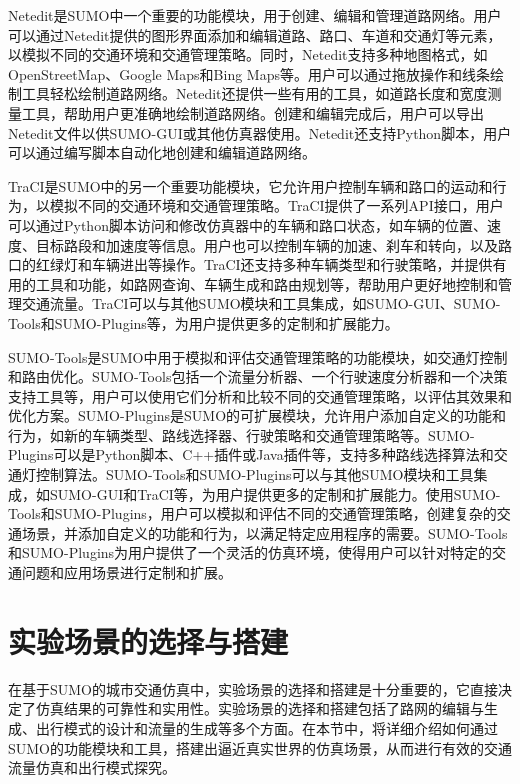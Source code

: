 Netedit是SUMO中一个重要的功能模块，用于创建、编辑和管理道路网络。用户可以通过Netedit提供的图形界面添加和编辑道路、路口、车道和交通灯等元素，以模拟不同的交通环境和交通管理策略。同时，Netedit支持多种地图格式，如OpenStreetMap、Google Maps和Bing Maps等。用户可以通过拖放操作和线条绘制工具轻松绘制道路网络。Netedit还提供一些有用的工具，如道路长度和宽度测量工具，帮助用户更准确地绘制道路网络。创建和编辑完成后，用户可以导出Netedit文件以供SUMO-GUI或其他仿真器使用。Netedit还支持Python脚本，用户可以通过编写脚本自动化地创建和编辑道路网络。

TraCI是SUMO中的另一个重要功能模块，它允许用户控制车辆和路口的运动和行为，以模拟不同的交通环境和交通管理策略。TraCI提供了一系列API接口，用户可以通过Python脚本访问和修改仿真器中的车辆和路口状态，如车辆的位置、速度、目标路段和加速度等信息。用户也可以控制车辆的加速、刹车和转向，以及路口的红绿灯和车辆进出等操作。TraCI还支持多种车辆类型和行驶策略，并提供有用的工具和功能，如路网查询、车辆生成和路由规划等，帮助用户更好地控制和管理交通流量。TraCI可以与其他SUMO模块和工具集成，如SUMO-GUI、SUMO-Tools和SUMO-Plugins等，为用户提供更多的定制和扩展能力。

SUMO-Tools是SUMO中用于模拟和评估交通管理策略的功能模块，如交通灯控制和路由优化。SUMO-Tools包括一个流量分析器、一个行驶速度分析器和一个决策支持工具等，用户可以使用它们分析和比较不同的交通管理策略，以评估其效果和优化方案。SUMO-Plugins是SUMO的可扩展模块，允许用户添加自定义的功能和行为，如新的车辆类型、路线选择器、行驶策略和交通管理策略等。SUMO-Plugins可以是Python脚本、C++插件或Java插件等，支持多种路线选择算法和交通灯控制算法。SUMO-Tools和SUMO-Plugins可以与其他SUMO模块和工具集成，如SUMO-GUI和TraCI等，为用户提供更多的定制和扩展能力。使用SUMO-Tools和SUMO-Plugins，用户可以模拟和评估不同的交通管理策略，创建复杂的交通场景，并添加自定义的功能和行为，以满足特定应用程序的需要。SUMO-Tools和SUMO-Plugins为用户提供了一个灵活的仿真环境，使得用户可以针对特定的交通问题和应用场景进行定制和扩展。



\section{实验场景的选择与搭建}

在基于SUMO的城市交通仿真中，实验场景的选择和搭建是十分重要的，它直接决定了仿真结果的可靠性和实用性。实验场景的选择和搭建包括了路网的编辑与生成、出行模式的设计和流量的生成等多个方面。在本节中，将详细介绍如何通过SUMO的功能模块和工具，搭建出逼近真实世界的仿真场景，从而进行有效的交通流量仿真和出行模式探究。

